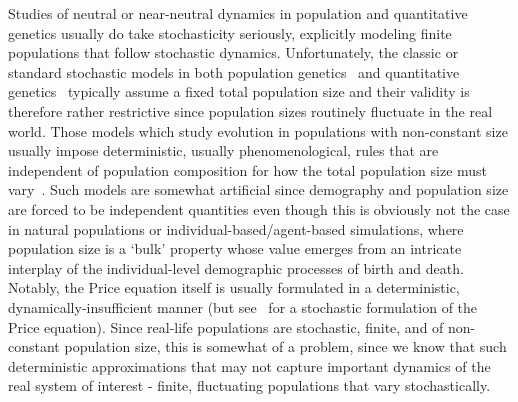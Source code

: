 Studies of neutral or near-neutral dynamics in population and quantitative genetics usually do take stochasticity seriously, explicitly modeling finite populations that follow stochastic dynamics. Unfortunately, the classic or standard stochastic models in both population genetics~\citep{fisher_genetical_1930,wright_evolution_1931, moran_random_1958, kimura_diffusion_1964} and quantitative genetics~\citep{crow_introduction_1970, lande_natural_1976} typically assume a fixed total population size and their validity is therefore rather restrictive since population sizes routinely fluctuate in the real world. Those models which study evolution in populations with non-constant size usually impose deterministic, usually phenomenological, rules that are independent of population composition for how the total population size must vary~\citep{kimura_probability_1974,ewens_probability_1967,otto_probability_1997, engen_fixation_2009, waxman_unified_2011}. Such models are somewhat artificial since demography and population size are forced to be independent quantities even though this is obviously not the case in natural populations or individual-based/agent-based simulations, where population size is a `bulk' property whose value emerges from an intricate interplay of the individual-level demographic processes of birth and death. Notably, the Price equation itself is usually formulated in a deterministic, dynamically-insufficient manner (but see~\cite{rice_stochastic_2008} for a stochastic formulation of the Price equation). Since real-life populations are stochastic, finite, and of non-constant population size, this is somewhat of a problem, since we know that such deterministic approximations that may not capture important dynamics of the real system of interest - finite, fluctuating populations that vary stochastically.

